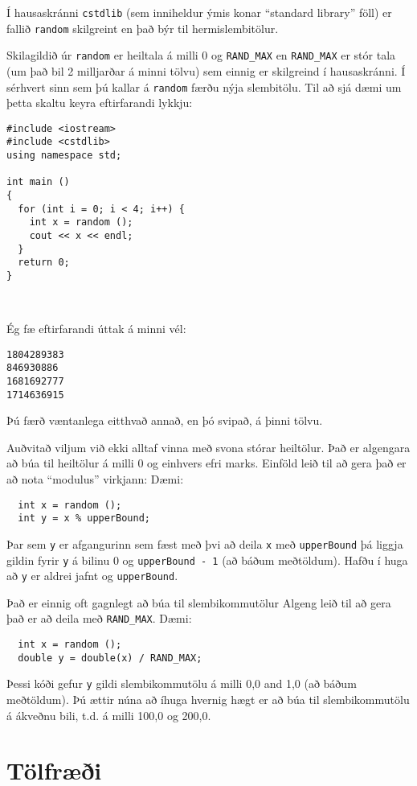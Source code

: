 Í hausaskránni {\tt cstdlib} (sem inniheldur ýmis konar ``standard library'' föll) er fallið {\tt random} skilgreint en það býr til hermislembitölur.

Skilagildið úr {\tt random} er heiltala á milli 0 og {\tt RAND\_MAX}
en {\tt RAND\_MAX} er stór tala (um það bil 2 milljarðar á minni tölvu) sem einnig er skilgreind í hausaskránni.
Í sérhvert sinn sem þú kallar á {\tt random} færðu nýja slembitölu.
Til að sjá dæmi um þetta skaltu keyra eftirfarandi lykkju:

\begin{verbatim}
#include <iostream>
#include <cstdlib>
using namespace std;

int main ()
{
  for (int i = 0; i < 4; i++) {
    int x = random ();
    cout << x << endl;
  }
  return 0;
}

  
\end{verbatim}
%
Ég fæ eftirfarandi úttak á minni vél: 

\begin{verbatim}
1804289383
846930886
1681692777
1714636915
\end{verbatim}
%
Þú færð væntanlega eitthvað annað, en þó svipað, á þinni tölvu.

Auðvitað viljum við ekki alltaf vinna með svona stórar heiltölur.
Það er algengara að búa til heiltölur á milli 0 og einhvers efri marks.
Einföld leið til að gera það er að nota ``modulus'' virkjann:
Dæmi:

\begin{verbatim}
  int x = random ();
  int y = x % upperBound;
\end{verbatim}
%
Þar sem {\tt y} er afgangurinn sem fæst með þvi að deila {\tt x} með {\tt upperBound} þá liggja gildin fyrir {\tt y} á bilinu 0 og {\tt upperBound - 1} (að báðum meðtöldum).
Hafðu í huga að {\tt y} er aldrei jafnt og {\tt upperBound}.

Það er einnig oft gagnlegt að búa til slembikommutölur
Algeng leið til að gera það er að deila með {\tt RAND\_MAX}.
Dæmi:

\begin{verbatim}
  int x = random ();
  double y = double(x) / RAND_MAX;
\end{verbatim}
%
Þessi kóði gefur {\tt y} gildi slembikommutölu á milli 0,0 and 1,0 (að báðum meðtöldum).
Þú ættir núna að íhuga hvernig hægt er að búa til slembikommutölu á ákveðnu bili, t.d. á milli 100,0 og 200,0.

\section{Tölfræði}

